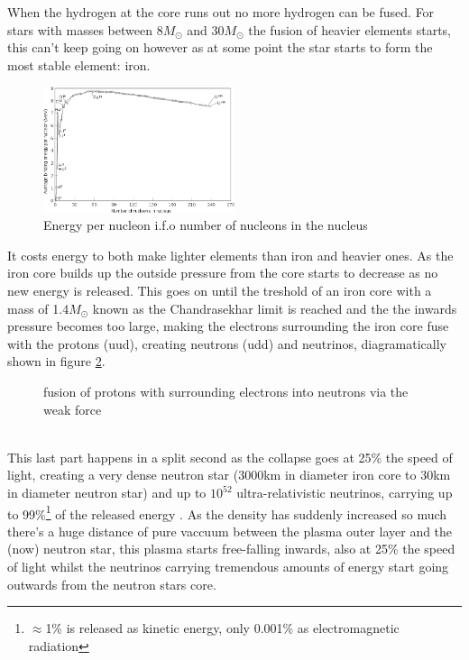 \documentclass[11pt,a4paper,faculty=we,language=en,doctype=report]{cls/ugent-doc}
\begin{document}
When the hydrogen at the core runs out no more hydrogen can be fused. For
stars with masses between $8M_\odot$ and $30M_\odot$ the
fusion of heavier elements starts, this can't keep going on however as at some
point the star starts to form the most stable element: iron. 
\begin{figure}[!ht]
	\centering
	\includegraphics[width=0.5\textwidth]{Binding_energy_curve.png}
	\caption{Energy per nucleon i.f.o number of nucleons in the nucleus}
	\label{fig:BindingEnergyCurve}
\end{figure}
It costs energy
to both make lighter elements than iron and heavier ones.  As the iron core
builds up the outside pressure from the core starts to decrease as no new
energy is released. This goes on until  the treshold of an iron core with a mass of 1.4$M_\odot$ known as the 
Chandrasekhar limit is reached and the the inwards pressure becomes too large,
making the electrons surrounding the iron core fuse with the protons (uud),
creating neutrons (udd) and neutrinos, diagramatically shown in figure
\ref{fig:CoreFusion}.
\begin{figure}
	\centering
	\caption{fusion of protons with surrounding electrons into neutrons via the weak force}
	\label{fig:CoreFusion}
\end{figure}\\
This last part happens in a split second as the collapse goes at 25\% the speed
of light, creating a very dense neutron star (3000km in diameter iron core to
30km in diameter neutron star) and up to $10^{52}$ ultra-relativistic
neutrinos, carrying up to 99\%\footnote{$\approx$1\% is released as kinetic energy, only 0.001\% as
electromagnetic radiation} of the released energy
\cite{Melson_2015}. As the density has suddenly increased so much
there's a huge distance of pure vaccuum between the plasma outer layer and the
(now) neutron star, this plasma starts free-falling inwards, also at 25\% the
speed of light whilst the neutrinos carrying tremendous amounts of energy start
going outwards from the neutron stars core.
\end{document}
